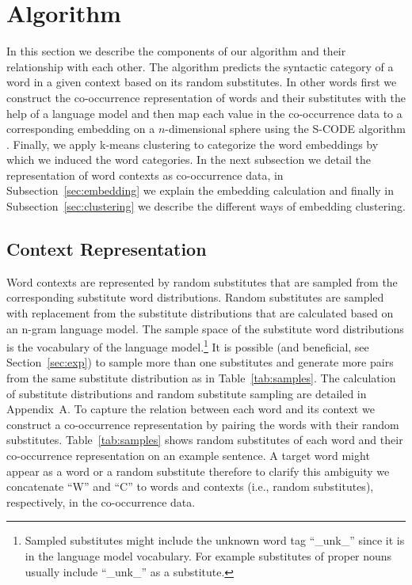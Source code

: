 \section{Algorithm}

In this section we describe the components of our algorithm and their
relationship with each other.  The algorithm predicts the syntactic
category of a word in a given context based on its random substitutes.
In other words first we construct the co-occurrence representation of
words and their substitutes with the help of a language model and then
map each value in the co-occurrence data to a corresponding embedding
on a $n$-dimensional sphere using the S-CODE algorithm
\cite{maron2010sphere}.  Finally, we apply k-means clustering to
categorize the word embeddings by which we induced the word
categories.  In the next subsection we detail the representation of
word contexts as co-occurrence data, in Subsection~\ref{sec:embedding}
we explain the embedding calculation and finally in
Subsection~\ref{sec:clustering} we describe the different ways of
embedding clustering.

\subsection{Context Representation}
\label{sec:cooc}

Word contexts are represented by random substitutes that are sampled
from the corresponding substitute word distributions.  Random
substitutes are sampled with replacement from the substitute
distributions that are calculated based on an n-gram language model.
The sample space of the substitute word distributions is the
vocabulary of the language model.\footnote{Sampled substitutes might
  include the unknown word tag ``\_unk\_'' since it is in the language
  model vocabulary.  For example substitutes of proper nouns usually
  include ``\_unk\_'' as a substitute.}  It is possible (and
beneficial, see Section~\ref{sec:exp}) to sample more than one
substitutes and generate more pairs from the same substitute
distribution as in Table~\ref{tab:samples}.  The calculation of
substitute distributions and random substitute sampling are detailed
in Appendix~A.  To capture the relation between each word and its
context we construct a co-occurrence representation by pairing the
words with their random substitutes.  Table~\ref{tab:samples} shows
random substitutes of each word and their co-occurrence representation
on an example sentence.  A target word might appear as a word or a
random substitute therefore to clarify this ambiguity we concatenate
``W'' and ``C'' to words and contexts (i.e., random substitutes),
respectively, in the co-occurrence data.

